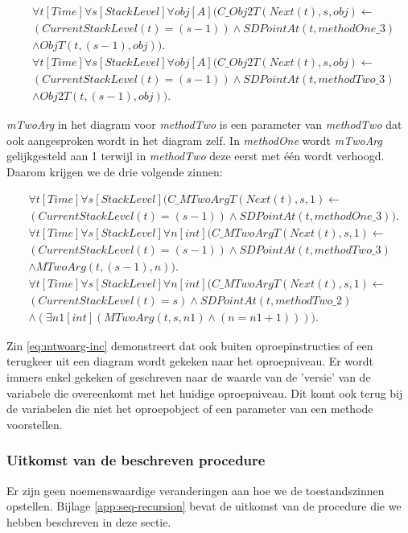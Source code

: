 \begin{align}
	\nonumber &\forall{t}[Time]\forall{s}[StackLevel]\forall{obj}[A](C\_Obj2T(Next(t), s, obj) \leftarrow
	\\ \nonumber &(CurrentStackLevel(t) = (s-1)) \land SDPointAt(t, methodOne\_3) \\ &\land ObjT(t, (s-1), obj)). \\
	\nonumber &\forall{t}[Time]\forall{s}[StackLevel]\forall{obj}[A](C\_Obj2T(Next(t), s, obj) \leftarrow
	\\ \nonumber &(CurrentStackLevel(t) = (s-1)) \land SDPointAt(t, methodTwo\_3) \\ &\land Obj2T(t, (s-1), obj)).
\end{align}

\textit{mTwoArg} in het diagram voor \textit{methodTwo} is een parameter van \textit{methodTwo} dat ook aangesproken wordt in het diagram zelf. In \textit{methodOne} wordt \textit{mTwoArg} gelijkgesteld aan 1 terwijl in \textit{methodTwo} deze eerst met \'e\'en wordt verhoogd. Daarom krijgen we de drie volgende zinnen:

\begin{align}
	\nonumber &\forall{t}[Time]\forall{s}[StackLevel](C\_MTwoArgT(Next(t), s, 1) \leftarrow \\ &(CurrentStackLevel(t) = (s-1)) \land SDPointAt(t, methodOne\_3)). \\
	\nonumber &\forall{t}[Time]\forall{s}[StackLevel]\forall{n}[int](C\_MTwoArgT(Next(t), s, 1) \leftarrow \\ \nonumber &(CurrentStackLevel(t) = (s-1)) \land SDPointAt(t, methodTwo\_3) \\ &\land MTwoArg(t, (s-1), n)). \\
	\nonumber &\forall{t}[Time]\forall{s}[StackLevel]\forall{n}[int](C\_MTwoArgT(Next(t), s, 1) \leftarrow \\ \nonumber &(CurrentStackLevel(t) = s) \land SDPointAt(t, methodTwo\_2) \\ &\land (\exists{n1}[int](MTwoArg(t, s, n1) \land (n = n1 + 1)))).\label{eq:mtwoarg-inc}
\end{align}

Zin \ref{eq:mtwoarg-inc} demonstreert dat ook buiten oproepinstructies of een terugkeer uit een diagram wordt gekeken naar het oproepniveau. Er wordt immers enkel gekeken of geschreven naar de waarde van de 'versie' van de variabele die overeenkomt met het huidige oproepniveau. Dit komt ook terug bij de variabelen die niet het oproepobject of een parameter van een methode voorstellen.

\subsubsection{Uitkomst van de beschreven procedure}
Er zijn geen noemenswaardige veranderingen aan hoe we de toestandszinnen opstellen. Bijlage \ref{app:seq-recursion} bevat de uitkomst van de procedure die we hebben beschreven in deze sectie. 